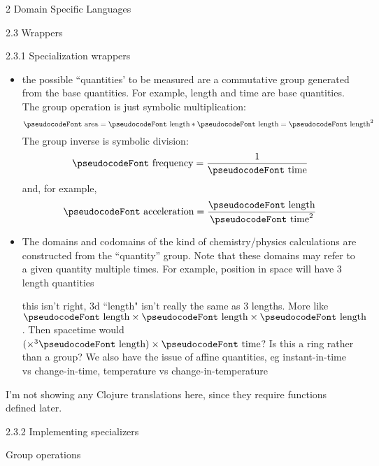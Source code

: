 \documentclass[12pt]{PalisadesLakesBook}
\begin{document}
\begin{plSection}{2 Domain Specific Languages}
\begin{plSection}{2.3 Wrappers}
\begin{plSection}{2.3.1 Specialization wrappers}
\begin{itemize}
  \item the possible ``quantities' to be measured are 
  a commutative group generated from the base quantities.
  For example, {\pseudocodeFont length} and 
  {\pseudocodeFont time} are base quantities.
  The group operation is just symbolic multiplication:
  \begin{equation}
  \text{\pseudocodeFont area} = 
  \text{\pseudocodeFont length} \ast \text{\pseudocodeFont length} 
  = \text{\pseudocodeFont length}^2 
  \end{equation}
  The group inverse is symbolic division:
  \begin{equation}
  \text{\pseudocodeFont frequency} = 
  \frac{1}{\text{\pseudocodeFont time}} 
  \end{equation}
  and, for example,
  \begin{equation}
  \text{\pseudocodeFont acceleration} = 
  \frac{\text{\pseudocodeFont length}}
       {\text{\pseudocodeFont time}^2} 
  \end{equation}
  
  \item The domains and codomains of the kind of
  chemistry/physics calculations are constructed from the
  ``quantity'' group. Note that these domains may refer to a
  given quantity multiple times. For example, position in space
  will have 3 {\pseudocodeFont length} quantities 
  
  \TODO this isn't right, 3d ``length" isn't
  really the same as 3 lengths.
  More like 
  $\text{\pseudocodeFont length} \times 
  \text{\pseudocodeFont length} \times 
  \text{\pseudocodeFont length}$.
  Then spacetime would $(\times^{3} \text{\pseudocodeFont length})
  \times \text{\pseudocodeFont time}$?
  Is this a ring rather than a group?
  We also have the issue of affine quantities,
  eg 
  {\pseudocodeFont instant-in-time} vs
  {\pseudocodeFont change-in-time},
  {\pseudocodeFont temperature} vs
  {\pseudocodeFont change-in-temperature}
    
\end{itemize}

I'm not showing any Clojure translations here, since they 
require functions defined later.

\end{plSection}%
\begin{plSection}{2.3.2 Implementing specializers}
\begin{plSection}{Group operations}


\end{plSection}
\end{plSection}
\end{plSection}
\end{plSection}
\end{document}

